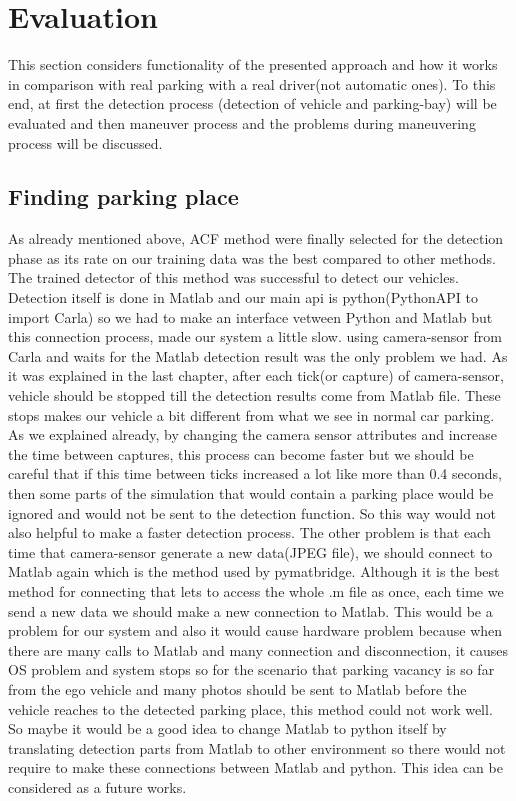 \chapter{Evaluation}\label{chapter:Evaluation}
This section considers functionality of the presented approach and how it works in comparison with real parking with a real driver(not automatic ones). To this end, at first the detection process (detection of vehicle and parking-bay) will be evaluated and then maneuver process and the problems during maneuvering process will be discussed.
\section{Finding parking place}
As already mentioned above, ACF method were finally selected for the detection phase as its rate on our training data was the best compared to other methods. The trained detector of this method was successful to detect our vehicles. Detection itself is done in Matlab and our main \acrshort{api} is python(PythonAPI to import Carla) so we had to make an interface vetween Python and Matlab but this connection process, made our system a little slow. using camera-sensor from Carla and waits for the Matlab detection result was the only problem we had. As it was explained in the last chapter, after each tick(or capture) of camera-sensor, vehicle should be stopped till the detection results come from Matlab file. These stops makes our vehicle a bit different from what we see in normal car parking. As we explained already, by changing the camera sensor attributes and increase the time between captures, this process can become faster but we should be careful that if this time between ticks increased a lot like more than 0.4 seconds, then some parts of the simulation that would contain a parking place would be ignored and would not be sent to the detection function. So this way would not also helpful to make a faster detection process. The other problem is that each time that camera-sensor generate a new data(JPEG file), we should connect to Matlab again which is the method used by pymatbridge. Although it is the best method for connecting that lets to access the whole .m file as once, each time we send a new data we should make a new connection to Matlab. This would be a problem for our system and also it would cause hardware problem because when there are many calls to Matlab and many connection and disconnection, it causes OS problem and system stops so for the scenario that parking vacancy is so far from the ego vehicle and many photos should be sent to Matlab before the vehicle reaches to the detected parking place, this method could not work well. So maybe it would be a good idea to change Matlab to python itself by translating detection parts from Matlab to other environment so there would not require to make these connections between Matlab and python. This idea can be considered as a future works.
